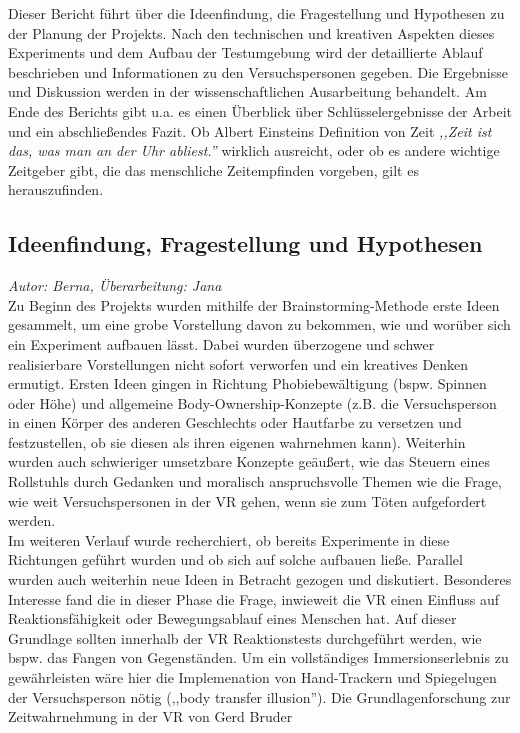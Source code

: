 \documentclass{Bericht}
\begin{document}
Dieser Bericht führt über die Ideenfindung, die Fragestellung und Hypothesen zu der Planung der Projekts. Nach den technischen und kreativen Aspekten dieses Experiments und dem Aufbau der Testumgebung wird der detaillierte Ablauf beschrieben und Informationen zu den Versuchspersonen gegeben. Die Ergebnisse und Diskussion werden in der wissenschaftlichen Ausarbeitung behandelt. Am Ende des Berichts gibt u.a. es einen Überblick über Schlüsselergebnisse der Arbeit und ein abschließendes Fazit. 	Ob  Albert Einsteins Definition von Zeit \textit{,,Zeit ist das, was man an der Uhr abliest.'' }\cite{einstein} wirklich ausreicht, oder ob es andere wichtige Zeitgeber gibt, die das menschliche Zeitempfinden vorgeben, gilt es herauszufinden. 

\subsection{Ideenfindung, Fragestellung und Hypothesen}
\label{subsec:ideenfindung}
\textit{Autor: Berna, Überarbeitung: Jana}\\
Zu Beginn des Projekts wurden mithilfe der Brainstorming-Methode erste Ideen gesammelt, um eine grobe Vorstellung davon zu bekommen, wie und worüber sich ein Experiment aufbauen lässt. Dabei wurden überzogene und schwer realisierbare Vorstellungen nicht sofort verworfen und ein kreatives Denken ermutigt.
Ersten Ideen gingen in Richtung Phobiebewältigung (bspw. Spinnen oder Höhe) und allgemeine Body-Ownership-Konzepte (z.B. die Versuchsperson in einen Körper des anderen Geschlechts oder Hautfarbe zu versetzen und festzustellen, ob sie diesen als ihren eigenen wahrnehmen kann). Weiterhin wurden auch schwieriger umsetzbare Konzepte geäußert, wie das Steuern eines Rollstuhls durch Gedanken und moralisch anspruchsvolle Themen wie die Frage, wie weit Versuchspersonen in der VR gehen, wenn sie zum Töten aufgefordert werden.\\
Im weiteren Verlauf wurde recherchiert, ob bereits Experimente in diese Richtungen geführt wurden und ob sich auf solche aufbauen ließe. Parallel wurden auch weiterhin neue Ideen in Betracht gezogen und diskutiert. Besonderes Interesse fand die in dieser Phase die Frage, inwieweit die VR einen Einfluss auf Reaktionsfähigkeit oder Bewegungsablauf eines Menschen hat. Auf dieser Grundlage sollten innerhalb der VR Reaktionstests durchgeführt werden, wie bspw. das Fangen von Gegenständen. Um ein vollständiges Immersionserlebnis zu gewährleisten wäre hier die Implemenation von Hand-Trackern und Spiegelugen der Versuchsperson nötig (,,body transfer illusion''). Die Grundlagenforschung zur Zeitwahrnehmung in der VR von Gerd Bruder\cite{voices} 
\end{document}
